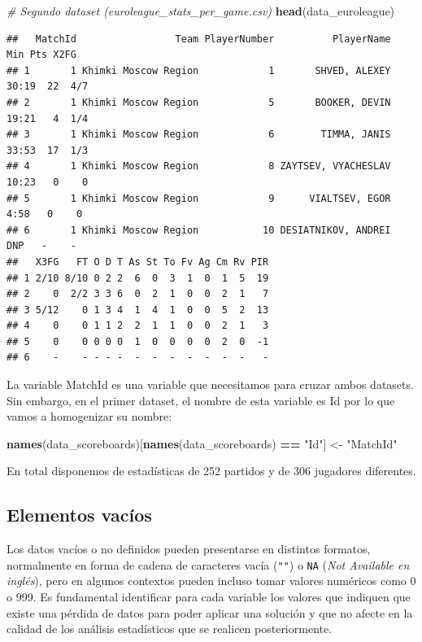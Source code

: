 \documentclass[
]{article}
\newenvironment{Shaded}{\begin{snugshade}}{\end{snugshade}}
\newcommand{\CommentTok}[1]{\textcolor[rgb]{0.56,0.35,0.01}{\textit{#1}}}
\newcommand{\KeywordTok}[1]{\textcolor[rgb]{0.13,0.29,0.53}{\textbf{#1}}}
\newcommand{\NormalTok}[1]{#1}
\newcommand{\OperatorTok}[1]{\textcolor[rgb]{0.81,0.36,0.00}{\textbf{#1}}}
\newcommand{\StringTok}[1]{\textcolor[rgb]{0.31,0.60,0.02}{#1}}
\begin{document}
\newpage

\begin{Shaded}
\begin{Highlighting}[]
\CommentTok{# Segundo dataset (euroleague_stats_per_game.csv)}
\KeywordTok{head}\NormalTok{(data_euroleague)}
\end{Highlighting}
\end{Shaded}

\begin{verbatim}
##   MatchId                 Team PlayerNumber          PlayerName   Min Pts X2FG
## 1       1 Khimki Moscow Region            1       SHVED, ALEXEY 30:19  22  4/7
## 2       1 Khimki Moscow Region            5       BOOKER, DEVIN 19:21   4  1/4
## 3       1 Khimki Moscow Region            6        TIMMA, JANIS 33:53  17  1/3
## 4       1 Khimki Moscow Region            8 ZAYTSEV, VYACHESLAV 10:23   0    0
## 5       1 Khimki Moscow Region            9      VIALTSEV, EGOR  4:58   0    0
## 6       1 Khimki Moscow Region           10 DESIATNIKOV, ANDREI   DNP   -    -
##   X3FG   FT O D T As St To Fv Ag Cm Rv PIR
## 1 2/10 8/10 0 2 2  6  0  3  1  0  1  5  19
## 2    0  2/2 3 3 6  0  2  1  0  0  2  1   7
## 3 5/12    0 1 3 4  1  4  1  0  0  5  2  13
## 4    0    0 1 1 2  2  1  1  0  0  2  1   3
## 5    0    0 0 0 0  1  0  0  0  0  2  0  -1
## 6    -    - - - -  -  -  -  -  -  -  -   -
\end{verbatim}

La variable MatchId es una variable que necesitamos para cruzar ambos
datasets. Sin embargo, en el primer dataset, el nombre de esta variable
es Id por lo que vamos a homogenizar su nombre:

\begin{Shaded}
\begin{Highlighting}[]
\KeywordTok{names}\NormalTok{(data_scoreboards)[}\KeywordTok{names}\NormalTok{(data_scoreboards) }\OperatorTok{==}\StringTok{ "Id"}\NormalTok{] <-}\StringTok{ "MatchId"}
\end{Highlighting}
\end{Shaded}

En total disponemos de estadísticas de 252 partidos y de 306 jugadores
diferentes.

\hypertarget{elementos-vacuxedos}{%
\subsection{Elementos vacíos}\label{elementos-vacuxedos}}

Los datos vacíos o no definidos pueden presentarse en distintos
formatos, normalmente en forma de cadena de caracteres vacía
(\texttt{""}) o \texttt{NA} (\emph{Not Available en inglés}), pero en
algunos contextos pueden incluso tomar valores numéricos como 0 o 999.
Es fundamental identificar para cada variable los valores que indiquen
que existe una pérdida de datos para poder aplicar una solución y que no
afecte en la calidad de los análisis estadísticos que se realicen
posteriormente.
\end{document}
